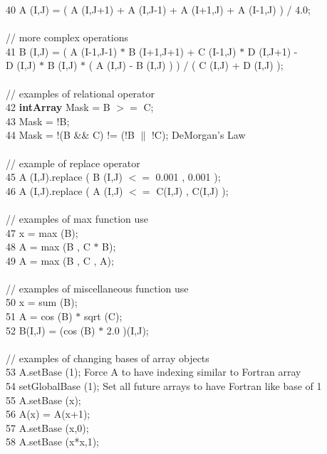 {\begin{tabbing}
40  \>\> A (I,J) = ( A (I,J+1) + A (I,J-1) + A (I+1,J) + A (I-1,J) ) / 4.0; \\
    \\
    \> // more complex operations \\
41  \>\> B (I,J) = ( A (I-1,J-1) $*$ B (I+1,J+1) + C (I-1,J) $*$ D (I,J+1) -  \\ 
    \>\> \> \>       D (I,J) $*$ B (I,J) $*$ ( A (I,J) - B (I,J) ) ) / ( C (I,J) + D (I,J) ); \\
    \\
    \>// examples of relational operator \\
42  \>\> {\bf intArray} Mask = B $>=$ C; \\
43  \>\> Mask = !B; \\
44  \>\> Mask = !(B \&\& C) != (!B $\|$ !C); DeMorgan's Law \\
    \\
    \>// example of replace operator \\
45  \>\> A (I,J).replace ( B (I,J) $<=$ 0.001 , 0.001 ); \\ 
46  \>\> A (I,J).replace ( A (I,J) $<=$ C(I,J) , C(I,J) ); \\ 
    \\
    \>// examples of max function use \\
47  \>\> x = max (B); \\
48  \>\> A = max (B , C $*$ B); \\
49  \>\> A = max (B , C , A); \\
    \\
    \>// examples of miscellaneous function use \\
50  \>\> x = sum (B); \\
51  \>\> A = cos (B) $*$ sqrt (C); \\
52  \>\> B(I,J) = (cos (B) $*$ 2.0 )(I,J); \\
    \\
    \>// examples of changing bases of array objects \\
53  \>\> A.setBase (1);  Force A to have indexing similar to Fortran array \\
54  \>\> setGlobalBase (1); Set all future arrays to have Fortran like base of 1 \\
55  \>\> A.setBase (x); \\
56  \>\> A(x) = A(x+1); \\
57  \>\> A.setBase (x,0); \\
58  \>\> A.setBase (x*x,1); \\
    \\

\end{tabbing}}
